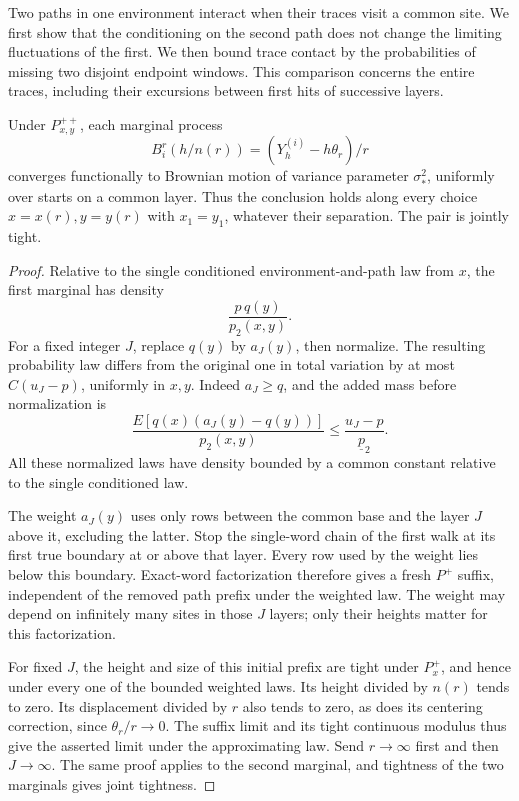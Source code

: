 Two paths in one environment interact when their traces visit a common
site. We first show that the conditioning on the second path does not
change the limiting fluctuations of the first. We then bound trace
contact by the probabilities of missing two disjoint endpoint windows.
This comparison concerns the entire traces, including their excursions
between first hits of successive layers.

\begin{lemma}\label{gauss-shared-marginals}
Under \(P_{x,y}^{++}\), each marginal process
\[
B_i^r(h/n(r))=(Y_h^{(i)}-h\theta_r)/r
\tag{16}\label{eq:16}
\]
converges functionally to Brownian motion of variance parameter
\(\sigma_*^2\), uniformly over starts on a common layer. Thus the
conclusion holds along every choice \(x=x(r),y=y(r)\) with
\(x_1=y_1\), whatever their separation. The pair is jointly tight.
\end{lemma}

\begin{proof}
Relative to the single conditioned environment-and-path law from \(x\),
the first marginal has density
\[
\frac{p\,q(y)}{p_2(x,y)}.
\]
For a fixed integer \(J\), replace \(q(y)\) by \(a_J(y)\), then
normalize. The resulting probability law differs from the original
one in total variation by at most \(C(u_J-p)\), uniformly in \(x,y\).
Indeed \(a_J\ge q\), and the added mass before normalization is
\[
\frac{E[q(x)(a_J(y)-q(y))]}{p_2(x,y)}
\le\frac{u_J-p}{\underline p_2}.
\]
All these normalized laws have density bounded by a common constant
relative to the single conditioned law.

The weight \(a_J(y)\) uses only rows between the common base and the
layer \(J\) above it, excluding the latter. Stop the single-word chain
of the first walk at its first true boundary at or above that layer.
Every row used by the weight lies below this boundary. Exact-word
factorization therefore gives a fresh \(P^+\) suffix, independent of
the removed path prefix under the weighted law. The weight may depend
on infinitely many sites in those \(J\) layers; only their heights
matter for this factorization.

For fixed \(J\), the height and size of this initial prefix are tight
under \(P_x^+\), and hence under every one of the bounded weighted laws.
Its height divided by \(n(r)\) tends to zero. Its displacement divided
by \(r\) also tends to zero, as does its centering correction, since
\(\theta_r/r\to0\). The suffix limit and its tight continuous modulus
thus give the asserted limit under the approximating law. Send
\(r\to\infty\) first and then \(J\to\infty\). The same proof applies
to the second marginal, and tightness of the two marginals gives joint
tightness.
\end{proof}

